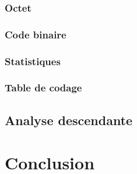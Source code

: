 \documentclass[12pt,a4paper]{article}
\begin{document}
\subsubsection{Octet}

\subsubsection{Code binaire}

\subsubsection{Statistiques}

\subsubsection{Table de codage}
%
\subsection{Analyse descendante}
%

\section*{Conclusion}

\end{document}
